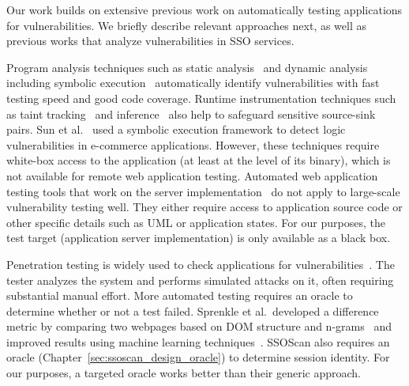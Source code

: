 Our work builds on extensive previous work on automatically testing applications for vulnerabilities.  We briefly describe relevant approaches next, as well as previous works that analyze vulnerabilities in SSO services.

 Program analysis techniques such as static analysis~\cite{Ball:2002:SLP:503272.503274} and dynamic analysis including symbolic execution~\cite{Cadar:2005:EGT:2156342.2156345,Kudzu} automatically identify vulnerabilities with fast testing speed and good code coverage.  Runtime instrumentation techniques such as taint tracking~\cite{Nentwich07cross-sitescripting} and inference~\cite{DBLP:conf:ndss:Sekar09} also help to safeguard sensitive source-sink pairs.  Sun et al.~\cite{SunDetectLogic} used a symbolic execution framework to detect logic vulnerabilities in e-commerce applications.  However, these techniques require white-box access to the application (at least at the level of its binary), which is not available for remote web application testing.  Automated web application testing tools that work on the server implementation~\cite{1167787,Ricca:2001:ATW:381473.381476,Alshahwan:2011:AWA:2190078.2190141} do not apply to large-scale vulnerability testing well.  They either require access to application source code or other specific details such as UML or application states.  For our purposes, the test target (application server implementation) is only available as a black box.

 Penetration testing is widely used to check applications for vulnerabilities~\cite{whitehat,redspin}.  The tester analyzes the system and performs simulated attacks on it, often requiring substantial manual effort.  More automated testing requires an oracle to determine whether or not a test failed.  Sprenkle et al.\ developed a difference metric by comparing two webpages based on DOM structure and n-grams~\cite{Sprenkle:2005:ARF:1101908.1101947} and improved results using machine learning techniques~\cite{Sprenkle07learningeffective}.  SSOScan also requires an oracle (Chapter~\ref{sec:ssoscan_design_oracle}) to determine session identity. For our purposes, a targeted oracle works better than their generic approach.

